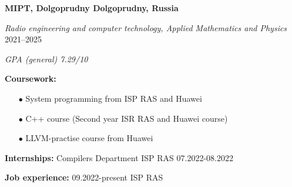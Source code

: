\textbf{MIPT, Dolgoprudny \hfill Dolgoprudny, Russia} \par
\textit{Radio engineering and computer technology, Applied Mathematics and Physics} \hfill 2021--2025\par
\textit{GPA (general) 7.29/10} \par
\textbf{Coursework:}
\begin{enumerate}
    \item[$\bullet$] System programming from ISP RAS and Huawei
    \item[$\bullet$] C++ course (Second year ISR RAS and Huawei course)
    \item[$\bullet$] LLVM-practise course from Huawei
\end{enumerate}
\textbf{Internships:} Compilers Department ISP RAS 07.2022-08.2022 \par
\textbf{Job experience:} 09.2022-present ISP RAS